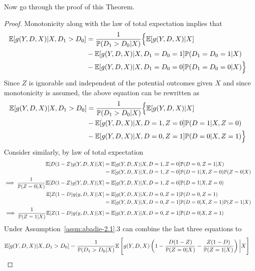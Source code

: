Now go through the proof of this Theorem. 
\begin{proof}
	Monotonicity along with the law of total expectation implies that 
	\begin{equation*}
		\begin{split}
			\mathbb{E}[g(Y,D,X) | X, D_1 > D_0] &= \frac{1}{\mathbb{P}(D_1 > D_0|X)}\Big\{\mathbb{E}[g(Y,D,X)|X] \\
										&- \mathbb{E}[g(Y,D,X)|X,D_1= D_0 = 1]\mathbb{P}(D_1 = D_0 = 1|X) \\
										&- \mathbb{E}[g(Y,D,X)|X,D_1= D_0 = 0]\mathbb{P}(D_1 = D_0 = 0|X)\Big\}
		\end{split}
	\end{equation*}
	Since $Z$ is ignorable and independent of the potential outcomes given $X$ and since monotonicity is assumed, the above equation can be rewritten as
	\begin{equation*}
		\begin{split}
			\mathbb{E}[g(Y,D,X) | X, D_1 > D_0] &= \frac{1}{\mathbb{P}(D_1 > D_0|X)}\Big\{\mathbb{E}[g(Y,D,X)|X] \\
										&- \mathbb{E}[g(Y,D,X)|X,D=1, Z= 0]\mathbb{P}(D = 1|X, Z= 0) \\
										&- \mathbb{E}[g(Y,D,X)|X,D = 0, Z= 1]\mathbb{P}(D = 0|X, Z = 1)\Big\}
		\end{split}
	\end{equation*}
	Consider similarly, by law of total expectation
	\begin{equation*}
		\begin{split}
			\mathbb{E}[D(1-Z)g(Y,D,X) | X] &= \mathbb{E}[g(Y,D,X)|X,D=1, Z=0]\mathbb{P}(D=0,Z=1|X) \\ 
								   &= \mathbb{E}[g(Y,D,X)|X,D=1, Z=0]\mathbb{P}(D=1|X,Z=0)\mathbb{P}(Z=0|X)\\
			\implies \frac{1}{\mathbb{P}(Z=0|X)}\mathbb{E}[D(1-Z)g(Y,D,X) | X] &= \mathbb{E}[g(Y,D,X)|X,D=1, Z=0]\mathbb{P}(D=1|X,Z=0)\\
			\mathbb{E}[Z(1-D)g(y,D,X)| X]  &= \mathbb{E}[g(Y,D,X)|X,D=0, Z=1]\mathbb{P}(D=0,Z=1)\\
								   &= \mathbb{E}[g(Y,D,X)|X,D=0, Z=1]\mathbb{P}(D=0|X,Z=1)\mathbb{P}(Z=1|X)\\
			\implies \frac{1}{\mathbb{P}(Z=1|X)}\mathbb{E}[Z(1-D)g(y,D,X)| X] &=  \mathbb{E}[g(Y,D,X)|X,D=0, Z=1]\mathbb{P}(D=0|X,Z=1)
		\end{split}
	\end{equation*}
	Under Assumption~\ref{assm:abadie-2.1}.3 can combine the last three equations to 
	\begin{equation*}
		\E[g(Y,D,X) | X, D_1 > D_0] = \frac{1}{\P(D_1 > D_0|X)}\E\left[g(Y,D,X)\left(1 - \frac{D(1-Z)}{\P(Z=0|X)} - \frac{Z(1-D)}{\P(Z=1|X)}\right)\bigg| X\right] \\ 

\end{equation*}
\end{proof}
